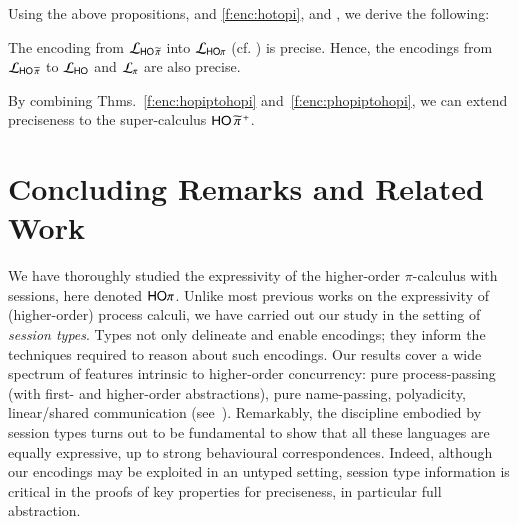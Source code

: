 \documentclass[runningheads]{llncs}
\begin{document}
{%
Using the above propositions,  
and 
\ref{f:enc:hotopi},
and , 
we derive the following: 
\begin{theorem}
	\label{f:enc:phopiptohopi}
	The encoding from
		$\mathcal{L}_{\mathsf{HO}\,{\widetilde{\pi}}}$ into $\mathcal{L}_{\mathsf{HO}\pi}$ (cf. )
	is precise. 
	Hence, the encodings 
	from
	$\mathcal{L}_{\mathsf{HO}\,{\widetilde{\pi}}}$ to $\mathcal{L}_{\mathsf{HO}}$ 
	and $\mathcal{L}_{\pi}$ 
	are also precise. 
\end{theorem}
By combining Thms.~\ref{f:enc:hopiptohopi} and~\ref{f:enc:phopiptohopi},
we can extend preciseness to the super-calculus
$\mathsf{HO}\,{\widetilde{\pi}}^{\,+}$.







\section{Concluding Remarks and Related Work}
\label{sec:relwork}
%

We have thoroughly studied the expressivity of  the higher-order $\pi$-calculus with sessions,
here denoted $\mathsf{HO}\pi$.
Unlike most previous works on the expressivity of 
(higher-order) process calculi, we have carried out our study in the setting of \emph{session types}. %
Types not only delineate and enable encodings; they 
inform the techniques required to reason about such encodings.
Our results cover a wide spectrum of features intrinsic to higher-order concurrency:
pure process-passing (with first- and higher-order abstractions), pure name-passing, polyadicity, 
linear/shared communication (see~). 
Remarkably, the discipline embodied by 
session types turns out to be fundamental to show that all these languages are equally expressive, up to 
 strong behavioural correspondences. Indeed, although our encodings may be exploited in an untyped setting,
session type information is critical in the proofs of key properties for preciseness, in particular full abstraction.

}
\end{document}
